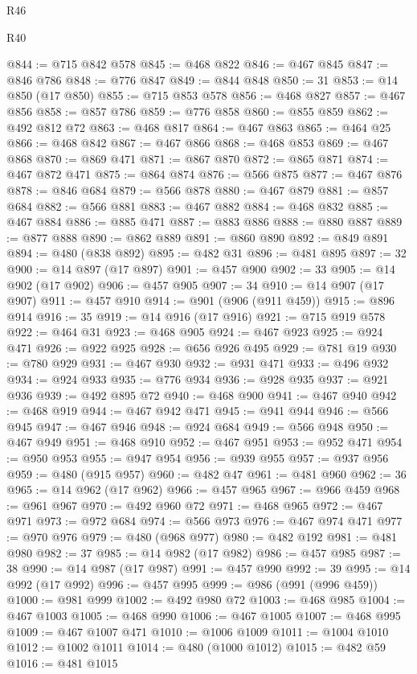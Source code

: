 \begin{lexlean}{R46}
\begin{lexlean}{R40}
\begin{coremodule}
{{{{{{{{{{{{{{{{{{{{{{{{{{{{{{{{{{{{{{{{{{{{{{{{{{{{{{{{{{{{{{{{{{{{{{{{{{{{{{{{{{{{{{{{{{{{{{{{{{{{{{{{{{{{{@844 := @715 @842 @578
@845 := @468 @822
@846 := @467 @845
@847 := @846 @786
@848 := @776 @847
@849 := @844 @848
@850 := 31
@853 := @14 @850 (@17 @850)
@855 := @715 @853 @578
@856 := @468 @827
@857 := @467 @856
@858 := @857 @786
@859 := @776 @858
@860 := @855 @859
@862 := @492 @812 @72
@863 := @468 @817
@864 := @467 @863
@865 := @464 @25
@866 := @468 @842
@867 := @467 @866
@868 := @468 @853
@869 := @467 @868
@870 := @869 @471
@871 := @867 @870
@872 := @865 @871
@874 := @467 @872 @471
@875 := @864 @874
@876 := @566 @875
@877 := @467 @876
@878 := @846 @684
@879 := @566 @878
@880 := @467 @879
@881 := @857 @684
@882 := @566 @881
@883 := @467 @882
@884 := @468 @832
@885 := @467 @884
@886 := @885 @471
@887 := @883 @886
@888 := @880 @887
@889 := @877 @888
@890 := @862 @889
@891 := @860 @890
@892 := @849 @891
@894 := @480 (@838 @892)
@895 := @482 @31
@896 := @481 @895
@897 := 32
@900 := @14 @897 (@17 @897)
@901 := @457 @900
@902 := 33
@905 := @14 @902 (@17 @902)
@906 := @457 @905
@907 := 34
@910 := @14 @907 (@17 @907)
@911 := @457 @910
@914 := @901 (@906 (@911 @459))
@915 := @896 @914
@916 := 35
@919 := @14 @916 (@17 @916)
@921 := @715 @919 @578
@922 := @464 @31
@923 := @468 @905
@924 := @467 @923
@925 := @924 @471
@926 := @922 @925
@928 := @656 @926 @495
@929 := @781 @19
@930 := @780 @929
@931 := @467 @930
@932 := @931 @471
@933 := @496 @932
@934 := @924 @933
@935 := @776 @934
@936 := @928 @935
@937 := @921 @936
@939 := @492 @895 @72
@940 := @468 @900
@941 := @467 @940
@942 := @468 @919
@944 := @467 @942 @471
@945 := @941 @944
@946 := @566 @945
@947 := @467 @946
@948 := @924 @684
@949 := @566 @948
@950 := @467 @949
@951 := @468 @910
@952 := @467 @951
@953 := @952 @471
@954 := @950 @953
@955 := @947 @954
@956 := @939 @955
@957 := @937 @956
@959 := @480 (@915 @957)
@960 := @482 @47
@961 := @481 @960
@962 := 36
@965 := @14 @962 (@17 @962)
@966 := @457 @965
@967 := @966 @459
@968 := @961 @967
@970 := @492 @960 @72
@971 := @468 @965
@972 := @467 @971
@973 := @972 @684
@974 := @566 @973
@976 := @467 @974 @471
@977 := @970 @976
@979 := @480 (@968 @977)
@980 := @482 @192
@981 := @481 @980
@982 := 37
@985 := @14 @982 (@17 @982)
@986 := @457 @985
@987 := 38
@990 := @14 @987 (@17 @987)
@991 := @457 @990
@992 := 39
@995 := @14 @992 (@17 @992)
@996 := @457 @995
@999 := @986 (@991 (@996 @459))
@1000 := @981 @999
@1002 := @492 @980 @72
@1003 := @468 @985
@1004 := @467 @1003
@1005 := @468 @990
@1006 := @467 @1005
@1007 := @468 @995
@1009 := @467 @1007 @471
@1010 := @1006 @1009
@1011 := @1004 @1010
@1012 := @1002 @1011
@1014 := @480 (@1000 @1012)
@1015 := @482 @59
@1016 := @481 @1015
}}}}}}}}}}}}}}}}}}}}}}}}}}}}}}}}}}}}}}}}}}}}}}}}}}}}}}}}}}}}}}}}}}}}}}}}}}}}}}}}}}}}}}}}}}}}}}}}}}}}}}}}}}}}}
\end{coremodule}
\end{lexlean}
\end{lexlean}
